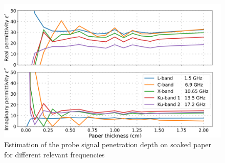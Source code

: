 

\begin{figure}[ht!]
    \centering  
    \includegraphics[width=\columnwidth]{Images/wet-paper.png}
    \caption[]{Estimation of the probe signal penetration depth on soaked paper for different relevant frequencies}\label{fig:wet-paper}
\end{figure}

